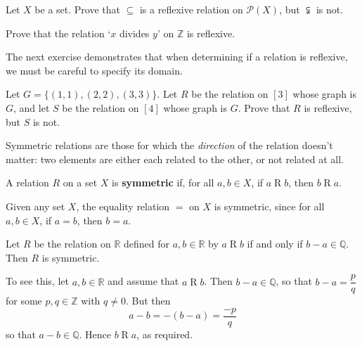 \begin{exercise}
\label{exSubsetIsReflexive}
Let $X$ be a set. Prove that $\subseteq$ is a reflexive relation on $\mathcal{P}(X)$, but $\subsetneqq$ is not.
\end{exercise}

\begin{exercise}
\label{exDivisibilityIsReflexive}
Prove that the relation `$x$ divides $y$' on $\mathbb{Z}$ is reflexive.
\end{exercise}

The next exercise demonstrates that when determining if a relation is reflexive, we must be careful to specify its domain.

\begin{exercise}
\label{exReflexivitySensitiveToDomainOfRelation}
Let $G = \{ (1,1), (2,2), (3,3) \}$. Let $R$ be the relation on $[3]$ whose graph is $G$, and let $S$ be the relation on $[4]$ whose graph is $G$. Prove that $R$ is reflexive, but $S$ is not.
\end{exercise}

Symmetric relations are those for which the \textit{direction} of the relation doesn't matter: two elements are either each related to the other, or not related at all.

\begin{definition}
\label{defSymmetricRelation}
A relation $R$ on a set $X$ is \textbf{symmetric} if, for all $a,b \in X$, if $a \mathrel{R} b$, then $b \mathrel{R} a$.
\end{definition}

\begin{center}
\end{center}

\begin{example}
\label{exEqualityIsSymmetric}
Given any set $X$, the equality relation $=$ on $X$ is symmetric, since for all $a,b \in X$, if $a=b$, then $b=a$.
\end{example}

\begin{example}
\label{exDifferenceOfRealsInQIsSymmetric}
Let $R$ be the relation on $\mathbb{R}$ defined for $a,b \in \mathbb{R}$ by $a \mathrel{R} b$ if and only if $b-a \in \mathbb{Q}$. Then $R$ is symmetric.

To see this, let $a,b \in \mathbb{R}$ and assume that $a \mathrel{R} b$. Then $b-a \in \mathbb{Q}$, so that $b-a = \dfrac{p}{q}$ for some $p,q \in \mathbb{Z}$ with $q \ne 0$. But then
\[ a-b = -(b-a) = \dfrac{-p}{q} \]
so that $a-b \in \mathbb{Q}$. Hence $b \mathrel{R} a$, as required.
\end{example}

